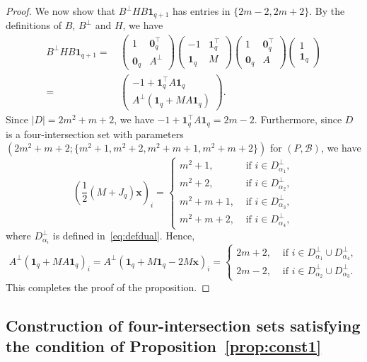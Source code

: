 \documentclass[ALCO,ThmDefs,Unicode]{cedram}
\newcommand*\tra{\top}
\newcommand*{\un}{\mathbf{1}}
\newcommand*{\bfx}{\mathbf{x}}
\newcommand*{\bfo}{\mathbf{0}}
\begin{document}
\begin{proof}
We now show that $B^\perp H B\un_{q+1}$ has entries in $\{2m-2,2m+2\}$. By the definitions of $B$, $B^\perp$ and $H$, we have
\begin{align*}
B^\perp H B\un_{q+1}=&\,
\begin{pmatrix} 1 & \bfo_q^\tra \\ \bfo_q & A^\perp
\end{pmatrix}
\begin{pmatrix} -1 & \un_q^\tra \\ \un_q & M
\end{pmatrix}
\begin{pmatrix} 1 & \bfo_q^\tra \\ \bfo_q & A
\end{pmatrix}
\begin{pmatrix} 1 \\ \un_q
\end{pmatrix}\\
=&\,
\begin{pmatrix} -1 + \un_q^\tra A \un_q \\
A^\perp (\un_q+MA\un_q)
\end{pmatrix}.
\end{align*}
Since $|D|=2m^2+m+2$, we have $-1 + \un_q^\tra A \un_q=2m-2$. Furthermore, since $D$ is a four-intersection set with parameters $(2m^2+m+2;\{m^2+1,m^2+2,m^2+m+1,m^2+m+2\})$ for $(P,{\mathcal B})$, we have
\[
\left(\frac{1}{2}(M+J_q)\bfx\right)_i=
\begin{cases}
m^2+1,& \text{ if } i\in D_{\alpha_1}^\perp,\\
m^2+2,& \text{ if } i\in D_{\alpha_2}^\perp,\\
m^2+m+1,& \text{ if } i\in D_{\alpha_3}^\perp, \\
m^2+m+2,& \text{ if } i\in D_{\alpha_4}^\perp,
\end{cases}
\]
where $D_{\alpha_i}^\perp$ is defined in~\eqref{eq:defdual}. Hence,
\[
A^\perp \left(\un_q+MA\un_q\right)_i= A^\perp \left(\un_q+M\un_q-2M\bfx\right)_i=
\begin{cases}
2m+2,& \text{ if } i\in D_{\alpha_1}^\perp \cup D_{\alpha_4}^\perp,\\
2m-2,& \text{ if } i\in D_{\alpha_2}^\perp \cup D_{\alpha_3}^\perp.
\end{cases}
\]
This completes the proof of the proposition.
\end{proof}

\subsection{Construction of four-intersection sets satisfying the condition of Proposition~\ref{prop:const1}}\label{sec:4.2}
\end{document}

